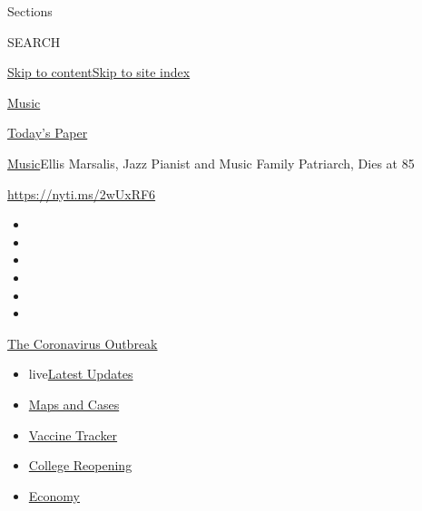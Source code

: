 Sections

SEARCH

\protect\hyperlink{site-content}{Skip to
content}\protect\hyperlink{site-index}{Skip to site index}

\href{https://www.nytimes.com/section/arts/music}{Music}

\href{https://myaccount.nytimes.com/auth/login?response_type=cookie\&client_id=vi}{}

\href{https://www.nytimes.com/section/todayspaper}{Today's Paper}

\href{/section/arts/music}{Music}\textbar{}Ellis Marsalis, Jazz Pianist
and Music Family Patriarch, Dies at 85

\url{https://nyti.ms/2wUxRF6}

\begin{itemize}
\item
\item
\item
\item
\item
\item
\end{itemize}

\href{https://www.nytimes.com/news-event/coronavirus?action=click\&pgtype=Article\&state=default\&region=TOP_BANNER\&context=storylines_menu}{The
Coronavirus Outbreak}

\begin{itemize}
\tightlist
\item
  live\href{https://www.nytimes.com/2020/08/03/world/coronavirus-covid-19.html?action=click\&pgtype=Article\&state=default\&region=TOP_BANNER\&context=storylines_menu}{Latest
  Updates}
\item
  \href{https://www.nytimes.com/interactive/2020/us/coronavirus-us-cases.html?action=click\&pgtype=Article\&state=default\&region=TOP_BANNER\&context=storylines_menu}{Maps
  and Cases}
\item
  \href{https://www.nytimes.com/interactive/2020/science/coronavirus-vaccine-tracker.html?action=click\&pgtype=Article\&state=default\&region=TOP_BANNER\&context=storylines_menu}{Vaccine
  Tracker}
\item
  \href{https://www.nytimes.com/2020/08/02/us/covid-college-reopening.html?action=click\&pgtype=Article\&state=default\&region=TOP_BANNER\&context=storylines_menu}{College
  Reopening}
\item
  \href{https://www.nytimes.com/live/2020/08/03/business/stock-market-today-coronavirus?action=click\&pgtype=Article\&state=default\&region=TOP_BANNER\&context=storylines_menu}{Economy}
\end{itemize}


